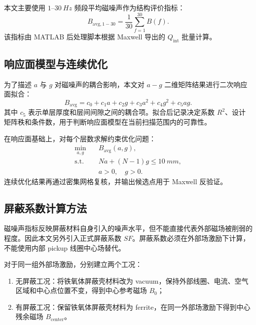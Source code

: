 \documentclass[UTF8,a4paper,12pt]{ctexart}
\begin{document}
本文主要使用 \(1\)--\(\SI{30}{Hz}\) 频段平均磁噪声作为结构评价指标：
\begin{equation}
    B_{\mathrm{avg},1-30} =
    \frac{1}{30}\sum_{f=1}^{30} B(f).
\end{equation}
该指标由 MATLAB 后处理脚本根据 Maxwell 导出的 \(Q_{\mathrm{int}}\) 批量计算。

\subsection{响应面模型与连续优化}

为了描述 \(a\) 与 \(g\) 对磁噪声的耦合影响，本文对 \(a-g\) 二维矩阵结果进行二次响应面拟合：
\begin{equation}
    B_{\mathrm{avg}} =
    c_0 + c_1a + c_2g + c_3a^2 + c_4g^2 + c_5ag .
\end{equation}
其中 \(c_5\) 表示单层厚度和层间间隙之间的耦合项。拟合后记录决定系数 \(R^2\)、设计矩阵秩和条件数，用于判断响应面模型在当前扫描范围内的可靠性。

在响应面基础上，对每个层数求解约束优化问题：
\begin{equation}
\begin{aligned}
    \min_{a,g}\quad & B_{\mathrm{avg}}(a,g), \\
    \mathrm{s.t.}\quad & Na+(N-1)g \leq \SI{10}{mm}, \\
    & a>0,\quad g>0 .
\end{aligned}
\end{equation}
连续优化结果再通过密集网格复核，并输出候选点用于 Maxwell 反验证。

\subsection{屏蔽系数计算方法}

磁噪声指标反映屏蔽材料自身引入的噪声水平，但不能直接代表外部磁场被削弱的程度。因此本文另外引入正式屏蔽系数 \(SF\)。屏蔽系数必须在外部场激励下计算，不能使用内部 pickup 线圈中心场替代。

对于同一组外部场激励，分别建立两个工况：
\begin{enumerate}
    \item 无屏蔽工况：将铁氧体屏蔽壳材料改为 vacuum，保持外部线圈、电流、空气区域和中心点位置不变，得到中心参考磁场 \(B_0\)；
    \item 有屏蔽工况：保留铁氧体屏蔽壳材料为 ferrite，在同一外部场激励下得到中心残余磁场 \(B_{\mathrm{center}}\)。
\end{enumerate}
\end{document}
